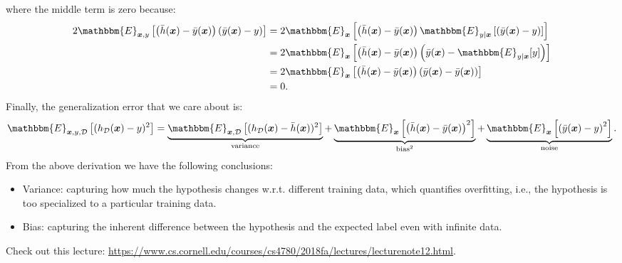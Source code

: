         where the middle term is zero because:
            \begin{equation}
                \begin{aligned}
                        2\mathbbm{E}_{\bm{x}, y }\left[ \left( \bar{h}(\bm{x}) - \bar{y}(\bm{x}) \right)\left( \bar{y}(\bm{x}) - y \right) \right]    & = 2\mathbbm{E}_{\bm{x}}\left[ \left( \bar{h}(\bm{x}) - \bar{y}(\bm{x}) \right)    \mathbbm{E}_{y|\bm{x}}\left[\left( \bar{y}(\bm{x}) - y \right) \right] \right] \\
                        & = 2\mathbbm{E}_{\bm{x}}\left[ \left( \bar{h}(\bm{x}) - \bar{y}(\bm{x}) \right) \left( \bar{y}(\bm{x}) - \mathbbm{E}_{y|\bm{x}}[y] \right) \right] \\
                        & = 2\mathbbm{E}_{\bm{x}}\left[ \left( \bar{h}(\bm{x}) - \bar{y}(\bm{x}) \right) \left( \bar{y}(\bm{x}) - \bar{y}(\bm{x}) \right) \right] \\
                        & = 0.
                \end{aligned}
            \end{equation}
        Finally, the generalization error that we care about is:
            \begin{equation}
                \mathbbm{E}_{\bm{x}, y, \mathcal{D}}\left[ (h_{\mathcal{D}}(\bm{x}) - y )^2 \right] = \underbrace{\mathbbm{E}_{\bm{x}, \mathcal{D}}\left[ (h_{\mathcal{D}}(\bm{x}) - \bar{h}(\bm{x}))^2 \right]}_{\text{variance}} + \underbrace{\mathbbm{E}_{\bm{x} }\left[ \left( \bar{h}(\bm{x}) - \bar{y}(\bm{x}) \right)^2 \right]}_{\text{bias}^2} + \underbrace{\mathbbm{E}_{\bm{x}}\left[ \left( \bar{y}(\bm{x}) - y \right)^2 \right]}_{\text{noise}}.
            \end{equation}
        From the above derivation we have the following conclusions:
            \begin{itemize}
                \item Variance: capturing how much the hypothesis changes w.r.t. different training data, which quantifies overfitting, i.e., the hypothesis is too specialized to a particular training data.
                \item Bias: capturing the inherent difference between the hypothesis and the expected label even with infinite data.
            \end{itemize}
        Check out this lecture: \url{https://www.cs.cornell.edu/courses/cs4780/2018fa/lectures/lecturenote12.html}.
        
